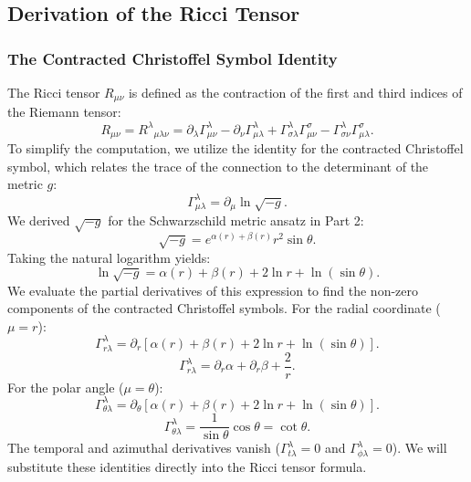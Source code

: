\documentclass[11pt, a4paper]{report}
\begin{document}
\subsection{Derivation of the Ricci Tensor}

\subsubsection{The Contracted Christoffel Symbol Identity}
The Ricci tensor $R_{\mu\nu}$ is defined as the contraction of the first and third indices of the Riemann tensor:
\begin{equation}
R_{\mu\nu} = {R^\lambda}_{\mu\lambda\nu} = \partial_\lambda \Gamma^\lambda_{\mu\nu} - \partial_\nu \Gamma^\lambda_{\mu\lambda} + \Gamma^\lambda_{\sigma\lambda} \Gamma^\sigma_{\mu\nu} - \Gamma^\lambda_{\sigma\nu} \Gamma^\sigma_{\mu\lambda}.
\end{equation}
To simplify the computation, we utilize the identity for the contracted Christoffel symbol, which relates the trace of the connection to the determinant of the metric $g$:
\begin{equation}
\Gamma^\lambda_{\mu\lambda} = \partial_\mu \ln \sqrt{-g}.
\end{equation}
We derived $\sqrt{-g}$ for the Schwarzschild metric ansatz in Part 2:
\begin{equation}
\sqrt{-g} = e^{\alpha(r) + \beta(r)} r^2 \sin\theta.
\end{equation}
Taking the natural logarithm yields:
\begin{equation}
\ln \sqrt{-g} = \alpha(r) + \beta(r) + 2\ln r + \ln(\sin\theta).
\end{equation}
We evaluate the partial derivatives of this expression to find the non-zero components of the contracted Christoffel symbols. For the radial coordinate ($\mu = r$):
\begin{equation}
\Gamma^\lambda_{r\lambda} = \partial_r \left[ \alpha(r) + \beta(r) + 2\ln r + \ln(\sin\theta) \right].
\end{equation}
\begin{equation}
\Gamma^\lambda_{r\lambda} = \partial_r\alpha + \partial_r\beta + \frac{2}{r}.
\end{equation}
For the polar angle ($\mu = \theta$):
\begin{equation}
\Gamma^\lambda_{\theta\lambda} = \partial_\theta \left[ \alpha(r) + \beta(r) + 2\ln r + \ln(\sin\theta) \right].
\end{equation}
\begin{equation}
\Gamma^\lambda_{\theta\lambda} = \frac{1}{\sin\theta} \cos\theta = \cot\theta.
\end{equation}
The temporal and azimuthal derivatives vanish ($\Gamma^\lambda_{t\lambda} = 0$ and $\Gamma^\lambda_{\phi\lambda} = 0$). We will substitute these identities directly into the Ricci tensor formula.
\end{document}
